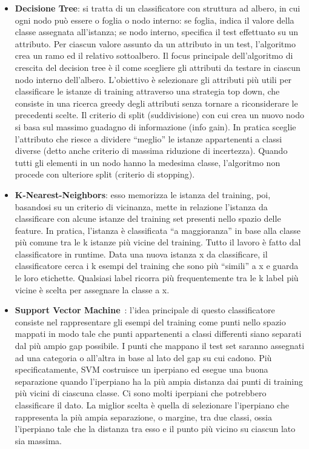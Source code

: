 \begin{itemize}
	\item \textbf{Decisione Tree}: si tratta di un classificatore con struttura ad albero, in cui ogni nodo può essere o foglia o nodo interno: se foglia, indica il valore della classe assegnata all'istanza; se nodo interno, specifica il test effettuato su un attributo. Per ciascun valore assunto da un attributo in un test, l'algoritmo crea un ramo ed il relativo sottoalbero. Il focus principale dell'algoritmo di crescita del decision tree è il come scegliere gli attributi da testare in ciascun nodo interno dell'albero. L'obiettivo è selezionare gli attributi più utili per classificare le istanze di training
	attraverso una strategia top down, che consiste in una ricerca greedy degli
	attributi senza tornare a riconsiderare le precedenti scelte. Il criterio di split (suddivisione) con cui crea un nuovo nodo si basa sul massimo guadagno di informazione (info gain). In pratica sceglie l'attributo che riesce a dividere “meglio” le istanze appartenenti a classi diverse (detto anche criterio di massima riduzione di incertezza). Quando tutti gli elementi in un nodo hanno la medesima classe, l'algoritmo non procede con ulteriore split (criterio di stopping).
	\item \textbf{K-Nearest-Neighbors}: esso memorizza le istanza del training, poi, basandosi su un criterio di vicinanza, mette in relazione l'istanza da classificare con alcune istanze del training set presenti nello spazio delle feature.  In pratica, l'istanza è classificata “a maggioranza” in base alla
	classe più comune tra le k istanze più vicine del training. Tutto il lavoro è fatto dal classificatore in runtime. Data una nuova istanza x da classificare, il classificatore cerca i k esempi del training che sono più “simili” a x e
	guarda le loro etichette. Qualsiasi label ricorra più frequentemente tra le k label più vicine è scelta per assegnare la classe a x.
	\item \textbf{Support Vector Machine}~\cite{89}:  l'idea principale di questo classificatore consiste nel rappresentare gli esempi del training come punti nello spazio mappati in modo tale che punti appartenenti a classi differenti siano separati dal più ampio gap possibile. I punti che mappano il test set saranno assegnati ad una categoria o all'altra in base al lato del gap su cui cadono. Più specificatamente, SVM costruisce un iperpiano ed esegue una buona separazione quando l'iperpiano ha la più ampia distanza dai punti di training più vicini di ciascuna classe. Ci sono molti iperpiani che potrebbero classificare il dato. La miglior scelta è quella di selezionare l'iperpiano che rappresenta la più ampia separazione, o margine, tra due classi, ossia l'iperpiano tale che la distanza tra esso e il punto più vicino su ciascun lato sia massima.
\end{itemize}
